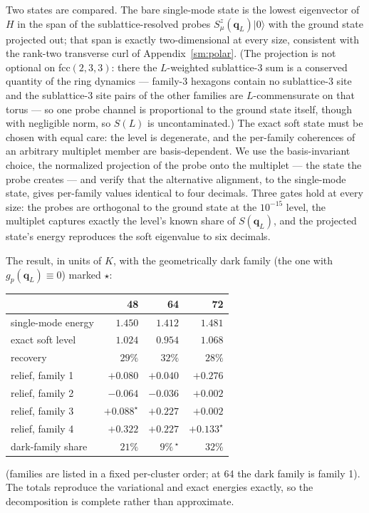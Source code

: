 \documentclass[aps,prl,twocolumn,amsmath,amssymb,superscriptaddress,
longbibliography,floatfix]{revtex4-2}
\newcommand{\bq}{\bm q}
\begin{document}
Two states are compared. The bare single-mode state is the lowest
eigenvector of $H$ in the span of the sublattice-resolved probes
$S^z_\mu(\bq_L)|0\rangle$ with the ground state projected out; that
span is exactly two-dimensional at every size, consistent with the
rank-two transverse curl of Appendix~\ref{sm:polar}. (The
projection is not optional on fcc$(2,3,3)$: there the
$L$-weighted sublattice-3 sum is a conserved quantity of the ring
dynamics --- family-3 hexagons contain no sublattice-3 site and the
sublattice-3 site pairs of the other families are $L$-commensurate on
that torus --- so one probe channel is proportional to the ground
state itself, though with negligible norm, so $S(L)$ is
uncontaminated.) The exact soft state must be chosen with equal
care: the level is degenerate, and the per-family coherences of an
arbitrary multiplet member are basis-dependent. We use the
basis-invariant choice, the normalized projection of the probe onto
the multiplet --- the state the probe creates --- and verify that the
alternative alignment, to the single-mode state, gives per-family
values identical to four decimals. Three gates hold at every size:
the probes are orthogonal to the ground state at the $10^{-15}$
level, the multiplet captures exactly the level's known share of
$S(\bq_L)$, and the projected state's energy reproduces the soft
eigenvalue to six decimals.

The result, in units of $K$, with the geometrically dark family (the
one with $g_p(\bq_L)\equiv0$) marked $\star$:
\begin{center}
\begin{tabular}{lrrr}
\hline\hline
 & 48 & 64 & 72\\
\hline
single-mode energy & $1.450$ & $1.412$ & $1.481$\\
exact soft level   & $1.024$ & $0.954$ & $1.068$\\
recovery           & $29\%$  & $32\%$  & $28\%$\\
\hline
relief, family 1 & $+0.080$ & $+0.040$ & $+0.276$\\
relief, family 2 & $-0.064$ & $-0.036$ & $+0.002$\\
relief, family 3 & $+0.088^\star$ & $+0.227$ & $+0.002$\\
relief, family 4 & $+0.322$ & $+0.227$ & $+0.133^\star$\\
\hline
dark-family share & $21\%$ & $9\%$\,$^\star$ & $32\%$\\
\hline\hline
\end{tabular}
\end{center}
(families are listed in a fixed per-cluster order; at 64 the dark
family is family 1). The totals reproduce the variational and exact
energies exactly, so the decomposition is complete rather than
approximate.
\end{document}
